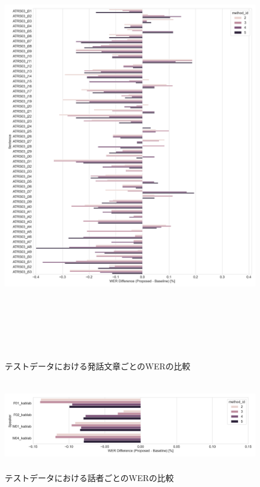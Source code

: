 \documentclass[12pt]{jarticle}
\numberwithin{equation}{section}    %
\numberwithin{figure}{section}      %
\numberwithin{table}{section}      %
\begin{document}
\begin{figure}[bt]
    \centering
    \includegraphics[height=190mm]{./figure/sec4/obj_metrics/wer_sample_wise_comparison.png}
    \caption{テストデータにおける発話文章ごとのWERの比較}
    \label{sec4:fig:wer_sample_wise_comparison}
\end{figure}

\begin{figure}[bt]
    \centering
    \includegraphics[height=40mm]{./figure/sec4/obj_metrics/wer_speaker_wise_comparison.png}
    \caption{テストデータにおける話者ごとのWERの比較}
    \label{sec4:fig:wer_speaker_wise_comparison}
\end{figure}
\end{document}
